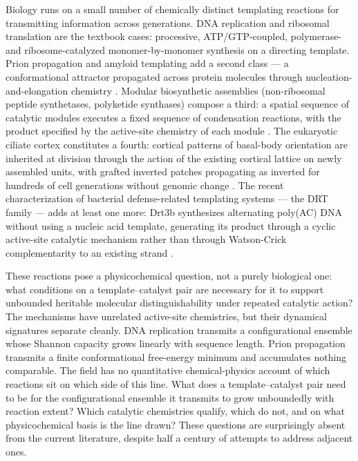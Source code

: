 \documentclass[aps,prx,reprint,amsmath,amssymb,floatfix,superscriptaddress,nofootinbib]{revtex4-2}
\theoremstyle{plain-thm}
\theoremstyle{definition-thm}
\begin{document}
Biology runs on a small number of chemically distinct templating reactions for transmitting information across generations. DNA replication and ribosomal translation are the textbook cases: processive, ATP/GTP-coupled, polymerase- and ribosome-catalyzed monomer-by-monomer synthesis on a directing template. Prion propagation and amyloid templating add a second class --- a conformational attractor propagated across protein molecules through nucleation-and-elongation chemistry \citep{Greenwald2016}. Modular biosynthetic assemblies (non-ribosomal peptide synthetases, polyketide synthases) compose a third: a spatial sequence of catalytic modules executes a fixed sequence of condensation reactions, with the product specified by the active-site chemistry of each module \citep{Walsh2001}. The eukaryotic ciliate cortex constitutes a fourth: cortical patterns of basal-body orientation are inherited at division through the action of the existing cortical lattice on newly assembled units, with grafted inverted patches propagating as inverted for hundreds of cell generations without genomic change \citep{BeissonSonneborn1965, Frankel1989}. The recent characterization of bacterial defense-related templating systems --- the DRT family \citep{Deng2026, DRT1preprint2026, DRT7preprint2026} --- adds at least one more: Drt3b synthesizes alternating poly(AC) DNA without using a nucleic acid template, generating its product through a cyclic active-site catalytic mechanism rather than through Watson-Crick complementarity to an existing strand \citep{Deng2026}.

These reactions pose a physicochemical question, not a purely biological one: what conditions on a template--catalyst pair are necessary for it to support unbounded heritable molecular distinguishability under repeated catalytic action? The mechanisms have unrelated active-site chemistries, but their dynamical signatures separate cleanly. DNA replication transmits a configurational ensemble whose Shannon capacity grows linearly with sequence length. Prion propagation transmits a finite conformational free-energy minimum and accumulates nothing comparable. The field has no quantitative chemical-physics account of which reactions sit on which side of this line. What does a template--catalyst pair need to be for the configurational ensemble it transmits to grow unboundedly with reaction extent? Which catalytic chemistries qualify, which do not, and on what physicochemical basis is the line drawn? These questions are surprisingly absent from the current literature, despite half a century of attempts to address adjacent ones.
\end{document}
